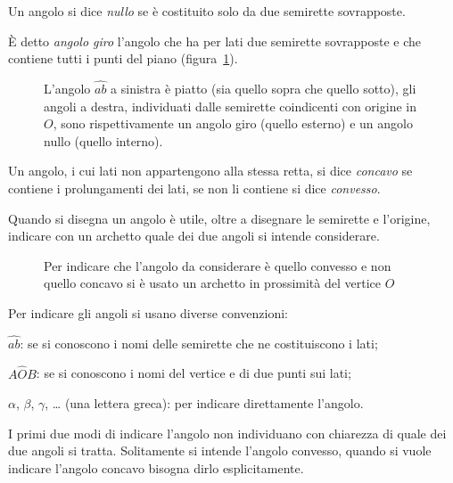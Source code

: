 \begin{definizione}
Un angolo si dice \emph{nullo} se è costituito solo da due semirette 
sovrapposte.
\end{definizione}

\begin{definizione}
\`E detto \emph{angolo giro} l'angolo che ha per lati due semirette 
sovrapposte e che contiene tutti i punti del piano 
(figura~\ref{fig:1.19}).
\end{definizione}

\begin{inaccessibleblock}
 \begin{figure}[bth]
 \centering 
 \caption{L'angolo  \(\widehat{ab}\) a sinistra è piatto (sia quello 
sopra che quello sotto), gli angoli a destra, individuati dalle 
semirette coindicenti con origine in \(O\), sono rispettivamente un 
angolo giro (quello esterno) e un angolo nullo (quello 
interno).}\label{fig:1.19}
\end{figure}
\end{inaccessibleblock}

\begin{definizione}
Un angolo, i cui lati non appartengono alla stessa retta, si dice 
\emph{concavo} se contiene i prolungamenti dei lati, se non li 
contiene si dice \emph{convesso}.
\end{definizione}

\begin{figure*}[htb]
\centering  
\caption{L'angolo concavo è quello in giallo in quanto contiene i 
prolungamenti dei lati (punteggiati)}\label{fig:1.20}
\end{figure*}

Quando si disegna un angolo è utile, oltre a disegnare le semirette e 
l'origine, indicare con un archetto quale dei due angoli si intende 
considerare.


\begin{inaccessibleblock}
 \begin{figure}[htb]
 \centering 
\caption{Per indicare che l'angolo da considerare è quello convesso e 
non quello concavo si è usato un archetto in prossimità del vertice 
\(O\)}\label{fig:1.21}
\end{figure}
\end{inaccessibleblock}

Per indicare gli angoli si usano diverse convenzioni:
\begin{itemize*}
\item  \(\widehat{ab}\): se si conoscono i nomi delle semirette che ne 
costituiscono i lati;
\item  \(A\widehat{O}B\): se si conoscono i nomi del vertice e di due 
punti sui lati;
\item  \(\alpha\), \(\beta\), \(\gamma\), \ldots{} (una lettera greca): per 
indicare direttamente l'angolo.
\end{itemize*}
I primi due modi di indicare l'angolo non individuano con chiarezza 
di quale dei due angoli si tratta. Solitamente si intende l'angolo 
convesso, quando si vuole indicare l'angolo concavo bisogna dirlo 
esplicitamente.

